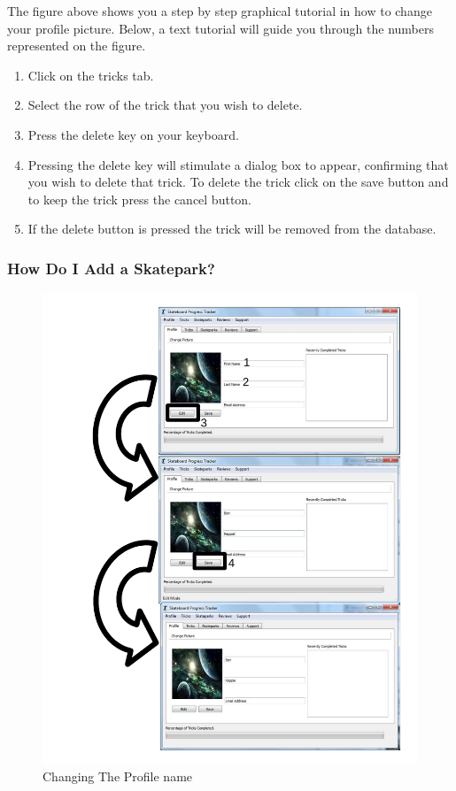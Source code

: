 The figure above shows you a step by step graphical tutorial in how to change your profile picture. Below, a text tutorial will guide you through the numbers represented on the figure.

\begin{enumerate}
\item Click on the tricks tab.
\item Select the row of the trick that you wish to delete.
\item Press the delete key on your keyboard.
\item Pressing the delete key will stimulate a dialog box to appear, confirming that you wish to delete that trick. To delete the trick click on the save button and to keep the trick press the cancel button.
\item If the delete button is pressed the trick will be removed from the database.
\end{enumerate}

\subsubsection{How Do I Add a Skatepark?}

\begin{figure}[H]
    \includegraphics[width=\textwidth]{./Manual/Images/ChangeName.pdf}
    \caption{Changing The Profile name} \label{fig:Change Name}
\end{figure}

